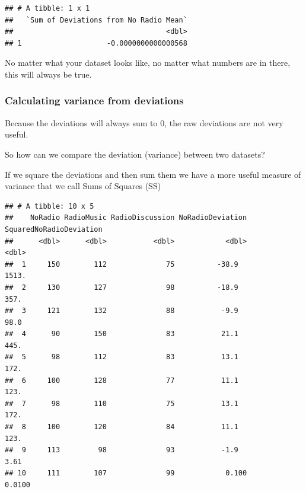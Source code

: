 \documentclass[
]{book}
\newenvironment{Shaded}{\begin{snugshade}}{\end{snugshade}}
\newcommand{\DataTypeTok}[1]{\textcolor[rgb]{0.13,0.29,0.53}{#1}}
\newcommand{\KeywordTok}[1]{\textcolor[rgb]{0.13,0.29,0.53}{\textbf{#1}}}
\newcommand{\NormalTok}[1]{#1}
\newcommand{\OperatorTok}[1]{\textcolor[rgb]{0.81,0.36,0.00}{\textbf{#1}}}
\newcommand{\StringTok}[1]{\textcolor[rgb]{0.31,0.60,0.02}{#1}}
\begin{document}
\begin{verbatim}
## # A tibble: 1 x 1
##   `Sum of Deviations from No Radio Mean`
##                                    <dbl>
## 1                    -0.0000000000000568
\end{verbatim}

\begin{hey}
No matter what your dataset looks like, no matter what numbers are in
there, this will always be true.
\end{hey}

\hypertarget{calculating-variance-from-deviations}{%
\subsubsection{Calculating variance from deviations}\label{calculating-variance-from-deviations}}

Because the deviations will always sum to 0, the raw deviations are not very useful.

So how can we compare the deviation (variance) between two datasets?

If we square the deviations and then sum them we have a more useful measure of variance that we call Sums of Squares (SS)

\begin{Shaded}
\end{Shaded}

\begin{verbatim}
## # A tibble: 10 x 5
##    NoRadio RadioMusic RadioDiscussion NoRadioDeviation SquaredNoRadioDeviation
##      <dbl>      <dbl>           <dbl>            <dbl>                   <dbl>
##  1     150        112              75          -38.9                 1513.    
##  2     130        127              98          -18.9                  357.    
##  3     121        132              88           -9.9                   98.0   
##  4      90        150              83           21.1                  445.    
##  5      98        112              83           13.1                  172.    
##  6     100        128              77           11.1                  123.    
##  7      98        110              75           13.1                  172.    
##  8     100        120              84           11.1                  123.    
##  9     113         98              93           -1.9                    3.61  
## 10     111        107              99            0.100                  0.0100
\end{verbatim}
\end{document}
